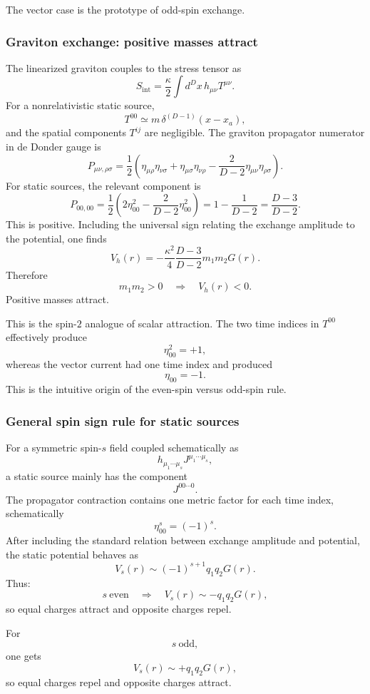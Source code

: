 \documentclass[
  10pt,
  a4paper,
  openany]{book}
\begin{document}
The vector case is the prototype of odd-spin exchange.

\subsubsection{Graviton exchange: positive masses
attract}\label{graviton-exchange-positive-masses-attract}

The linearized graviton couples to the stress tensor as \[
S_{\mathrm{int}}
=
\frac{\kappa}{2}
\int d^Dx\,h_{\mu\nu}T^{\mu\nu}.
\] For a nonrelativistic static source, \[
T^{00}\simeq m\,\delta^{(D-1)}(x-x_a),
\] and the spatial components \(T^{ij}\) are negligible. The graviton
propagator numerator in de Donder gauge is \[
P_{\mu\nu,\rho\sigma}
=
\frac{1}{2}
\left(
\eta_{\mu\rho}\eta_{\nu\sigma}
+
\eta_{\mu\sigma}\eta_{\nu\rho}
-
\frac{2}{D-2}\eta_{\mu\nu}\eta_{\rho\sigma}
\right).
\] For static sources, the relevant component is \[
P_{00,00}
=
\frac{1}{2}
\left(
2\eta_{00}^2
-
\frac{2}{D-2}\eta_{00}^2
\right)
=
1-\frac{1}{D-2}
=
\frac{D-3}{D-2}.
\] This is positive. Including the universal sign relating the exchange
amplitude to the potential, one finds \[
V_h(r)
=
-\frac{\kappa^2}{4}
\frac{D-3}{D-2}
m_1m_2G(r).
\] Therefore \[
m_1m_2>0
\quad\Longrightarrow\quad
V_h(r)<0.
\] Positive masses attract.

This is the spin-\(2\) analogue of scalar attraction. The two time
indices in \(T^{00}\) effectively produce \[
\eta_{00}^2=+1,
\] whereas the vector current had one time index and produced \[
\eta_{00}=-1.
\] This is the intuitive origin of the even-spin versus odd-spin rule.

\subsubsection{General spin sign rule for static
sources}\label{general-spin-sign-rule-for-static-sources}

For a symmetric spin-\(s\) field coupled schematically as \[
h_{\mu_1\cdots\mu_s}J^{\mu_1\cdots\mu_s},
\] a static source mainly has the component \[
J^{00\cdots 0}.
\] The propagator contraction contains one metric factor for each time
index, schematically \[
\eta_{00}^s=(-1)^s.
\] After including the standard relation between exchange amplitude and
potential, the static potential behaves as \[
V_s(r)
\sim
(-1)^{s+1}q_1q_2G(r).
\] Thus: \[
s\ \text{even}
\quad\Longrightarrow\quad
V_s(r)\sim -q_1q_2G(r),
\] so equal charges attract and opposite charges repel.

For \[
s\ \text{odd},
\] one gets \[
V_s(r)\sim +q_1q_2G(r),
\] so equal charges repel and opposite charges attract.
\end{document}
